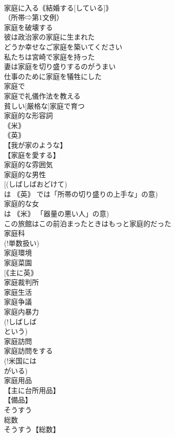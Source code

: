 \documentclass[8pt]{extreport}
\begin{document}
\begin{CJK}{UTF8}{min}
\\	家庭に入る｟結婚する[している]｠
\\	（所帯⇨第1文例）
\\	家庭を破壊する
\\	彼は政治家の家庭に生まれた
\\	どうか幸せなご家庭を築いてください
\\	私たちは宮崎で家庭を持った
\\	妻は家庭を切り盛りするのがうまい
\\	仕事のために家庭を犠牲にした
\\	家庭で
\\	家庭で礼儀作法を教える
\\	貧しい[厳格な]家庭で育つ
\\	家庭的な形容詞
\\	｟米｠
\\	｟英｠ 
\\	【我が家のような】
\\	【家庭を愛する】
\\	家庭的な雰囲気
\\	家庭的な男性
\\	[(しばしばおどけて) 
\\	は ｟英｠ では「所帯の切り盛りの上手な」の意)
\\	家庭的な女
\\	は ｟米｠ 「器量の悪い人」の意)
\\	この旅館はこの前泊まったときはもっと家庭的だった
\\	家庭科
\\	(!単数扱い) 
\\	家庭環境
\\	家庭菜園
\\	[｟主に英｠ 
\\	家庭裁判所
\\	家庭生活
\\	家庭争議
\\	家庭内暴力
\\	(!しばしば 
\\	という)
\\	家庭訪問
\\	家庭訪問をする
\\	(!米国には 
\\	がいる)
\\	家庭用品
\\	【主に台所用品】
\\	【備品】
\\	そうすう
\\	総数		
\\	そうすう【総数】

\end{CJK}
\end{document}
